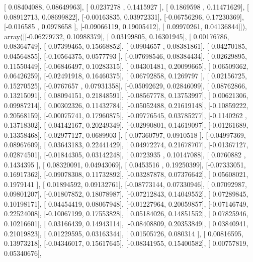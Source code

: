\documentclass{article}
\begin{document}
       [ 0.08404088,  0.08649963],
       [ 0.0237278 ,  0.1415927 ],
       [ 0.1869598 ,  0.11471629],
       [ 0.08912713,  0.08699822],
       [-0.00163835,  0.03972331],
       [-0.06756296,  0.17230369],
       [-0.016585  ,  0.0978658 ],
       [-0.09066119,  0.19005412],
       [ 0.09970261,  0.04136844]]), array([[-0.06279732,  0.10988379],
       [ 0.03199805,  0.16301945],
       [ 0.00176786,  0.08364749],
       [ 0.07399465,  0.15668852],
       [ 0.0904657 ,  0.08381861],
       [ 0.04270185,  0.04564855],
       [-0.10564375,  0.0577793 ],
       [-0.07698546,  0.08384434],
       [ 0.02629895,  0.11550449],
       [-0.06846497,  0.10283315],
       [ 0.04301481,  0.20099665],
       [ 0.06509362,  0.06426259],
       [-0.02491918,  0.16460375],
       [ 0.06792858,  0.1269797 ],
       [ 0.02156725,  0.15270525],
       [-0.0767657 ,  0.07931358],
       [-0.05092629,  0.02846099],
       [ 0.08762866,  0.13215091],
       [ 0.08094151,  0.21848591],
       [-0.08567778,  0.13753997],
       [ 0.00621306,  0.09987214],
       [ 0.00302326,  0.11432784],
       [-0.05052488,  0.21619148],
       [-0.10859222,  0.20568159],
       [-0.00075741,  0.17960875],
       [-0.09776545,  0.03785277],
       [-0.1140262 ,  0.13718302],
       [ 0.04142167,  0.20249349],
       [-0.02990801,  0.14619097],
       [-0.01261689,  0.13358468],
       [-0.02977127,  0.0689903 ],
       [ 0.07360797,  0.0910518 ],
       [-0.04997369,  0.08967609],
       [ 0.03643183,  0.22441429],
       [ 0.04972274,  0.21678707],
       [-0.01367127,  0.02874501],
       [-0.01844305,  0.03142248],
       [ 0.0723935 ,  0.10147088],
       [ 0.0760882 ,  0.1434395 ],
       [ 0.08320091,  0.04943069],
       [ 0.0453516 ,  0.19250399],
       [-0.07333051,  0.16917362],
       [-0.09078308,  0.11732892],
       [-0.03287878,  0.07376642],
       [ 0.05608021,  0.1979141 ],
       [ 0.01894592,  0.09132761],
       [-0.08773144,  0.07330946],
       [ 0.07092987,  0.09801207],
       [-0.01807852,  0.18078987],
       [-0.07212843,  0.14049552],
       [ 0.07289845,  0.10198171],
       [ 0.04454419,  0.08067948],
       [-0.01227964,  0.20059857],
       [-0.07146749,  0.22524008],
       [-0.10067199,  0.17553828],
       [ 0.05184026,  0.14851552],
       [ 0.07825946,  0.10216601],
       [ 0.03166439,  0.14943114],
       [-0.08408809,  0.20353849],
       [ 0.03840941,  0.21019823],
       [ 0.01229595,  0.03163344],
       [ 0.01505726,  0.080314  ],
       [ 0.00816595,  0.13973218],
       [-0.04346017,  0.15617645],
       [-0.08341955,  0.15400582],
       [ 0.00757819,  0.05340676],
\end{document}

